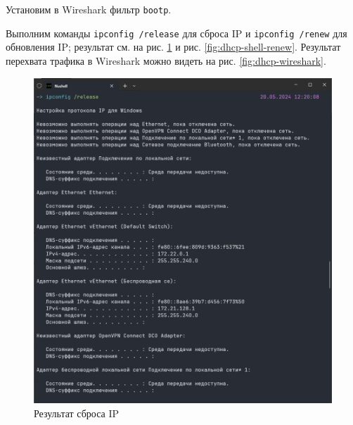 
Установим в Wireshark фильтр \verb|bootp|. 

Выполним команды \verb|ipconfig /release| для сброса IP и \verb|ipconfig /renew| для обновления IP; результат см. на рис. \ref{fig:dhcp-shell-release} и рис. \ref{fig:dhcp-shell-renew}. Результат перехвата трафика в Wireshark можно видеть на рис. \ref{fig:dhcp-wireshark}.

\begin{figure}[h]
    \centering
    \includegraphics[width=1\linewidth]{res/dhcp-shell-release.png}
    \caption{Результат сброса IP}
    \label{fig:dhcp-shell-release}
\end{figure}


